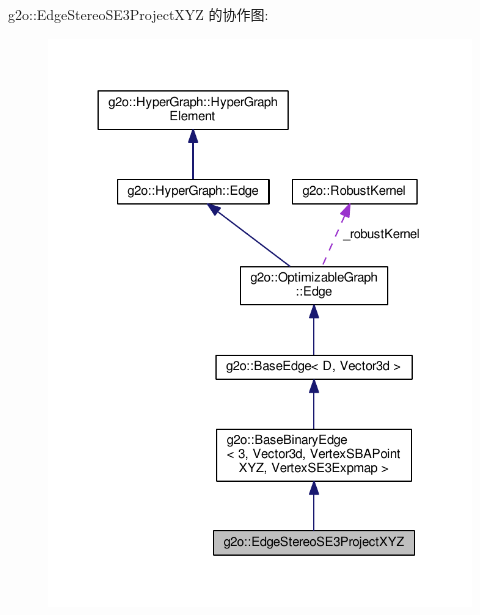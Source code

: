 g2o\-:\-:Edge\-Stereo\-S\-E3\-Project\-X\-Y\-Z 的协作图\-:
\nopagebreak
\begin{figure}[H]
\begin{center}
\leavevmode
\includegraphics[width=333pt]{classg2o_1_1EdgeStereoSE3ProjectXYZ__coll__graph}
\end{center}
\end{figure}

